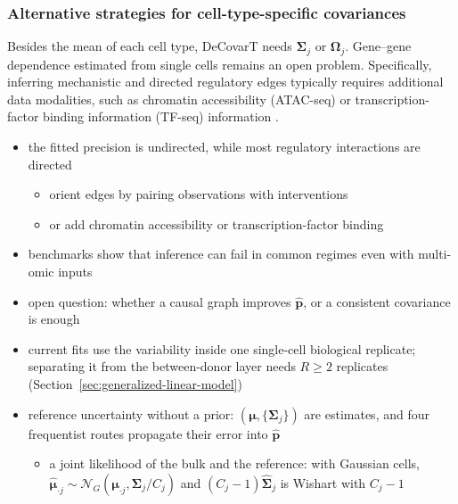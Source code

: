 \documentclass[pdflatex, sn-nature]{sn-jnl}
\theoremstyle{thmstyleone}%
\theoremstyle{thmstyletwo}%
\theoremstyle{thmstylethree}%
\begin{document}
\subsubsection{Alternative strategies for cell-type-specific covariances}
\label{sec:grn}

Besides the mean of each cell type, DeCovarT needs \(\boldsymbol{\Sigma}_{j}\) or \(\boldsymbol{\Omega}_{j}\).
Gene--gene dependence estimated from single cells remains an open problem. 
Specifically, inferring mechanistic and directed regulatory edges typically requires additional data modalities,
such as chromatin accessibility (ATAC-seq) or transcription-factor binding information (TF-seq)
information \cite{badia-i-mompelGeneRegulatoryNetwork2023,maizelsGeneRegulatoryNetworks2026}.

\begin{itemize}
  \item the fitted precision is undirected, while most regulatory interactions are directed
  \begin{itemize}
    \item orient edges by pairing observations with interventions
    \item or add chromatin accessibility or transcription-factor binding
          \cite{badia-i-mompelGeneRegulatoryNetwork2023,maizelsGeneRegulatoryNetworks2026}
  \end{itemize}
  \item benchmarks show that inference can fail in common regimes even with multi-omic inputs
        \cite{nourisaGeneRNIBLivingBenchmark2025}
  \item open question: whether a causal graph improves \(\hat{\boldsymbol{p}}\), or a consistent covariance is enough
  \item current fits use the variability inside one single-cell biological replicate; separating it from the
        between-donor layer needs \(R\ge2\) replicates (Section~\ref{sec:generalized-linear-model})
  \item reference uncertainty without a prior: \((\boldsymbol{\mu},\{\boldsymbol{\Sigma}_{j}\})\) are estimates, and four frequentist routes
        propagate their error into \(\hat{\boldsymbol{p}}\)
  \begin{itemize}
    \item a joint likelihood of the bulk and the reference: with Gaussian cells,
          \(\hat{\boldsymbol{\mu}}_{\cdot j}\sim\mathcal{N}_{G}(\boldsymbol{\mu}_{\cdot j},\boldsymbol{\Sigma}_{j}/C_{j})\) and \((C_{j}-1)\hat{\boldsymbol{\Sigma}}_{j}\) is Wishart with \(C_{j}-1\)

\end{itemize}
\end{itemize}
\end{document}
